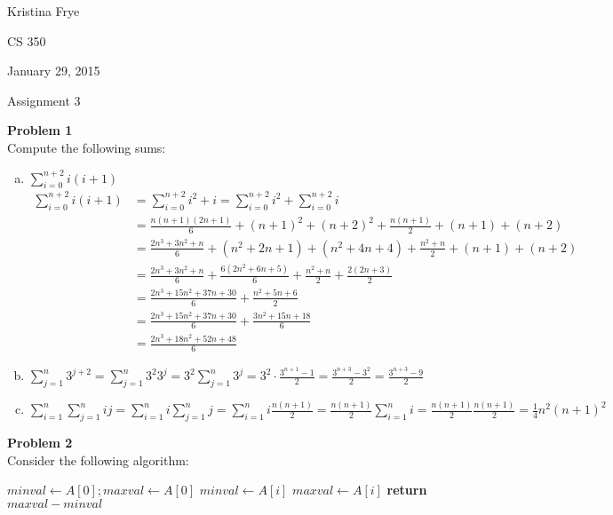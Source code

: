 \documentclass[11pt]{article}
\begin{document}
{\raggedleft Kristina Frye \par}
{\raggedleft CS 350 \par}
{\raggedleft January 29, 2015 \par}
{\raggedleft Assignment 3 \par} 
\noindent\textbf{Problem 1} \\
Compute the following sums:
\begin{enumerate}[(a)]
\item
$\displaystyle\sum_{i=0}^{n+2}i(i + 1)$
\begin{align*}
\sum_{i=0}^{n+2}i(i + 1) &=\sum_{i=0}^{n+2}i^2 + i =
\sum_{i=0}^{n+2}i^2 + \sum_{i=0}^{n+2}i \\
&=\frac{n(n+1)(2n + 1)}{6} + (n+1)^2 + (n+2)^2 + 
\frac{n(n+1)}{2} + (n+1) + (n+2)\\
&=\frac{2n^3 + 3n^2 + n}{6} + (n^2 + 2n + 1) + (n^2 + 4n + 4) +
\frac{n^2 + n}{2} + (n + 1) + (n + 2)\\
&=\frac{2n^3 + 3n^2 + n}{6} + 
\frac{6(2n^2 + 6n + 5)}{6} + \frac{n^2 + n}{2} +
\frac{2(2n + 3)}{2}\\
&=\frac{2n^3 + 15n^2 + 37n + 30}{6} + \frac{n^2 + 5n + 6}{2}\\
&=\frac{2n^3 + 15n^2 + 37n + 30}{6} + \frac{3n^2 + 15n + 18}{6}\\
&=\frac{2n^3 + 18n^2 + 52n + 48}{6}
\end{align*}
\item
$\displaystyle\sum_{j=1}^{n}3^{j+2} = 
\sum_{j=1}^{n}3^2 3^j = 3^2\sum_{j=1}^{n}3^j
= 3^2 \cdot \frac{3^{n+1}-1}{2}
= \frac{3^{n+3} - 3^2}{2}
= \frac{3^{n+3} - 9}{2}$

\item
$\displaystyle\sum_{i=1}^{n}\sum_{j=1}^{n}ij = 
\sum_{i=1}^{n}i\sum_{j=1}^{n}j =
\sum_{i=1}^{n}i \frac{n(n+1)}{2} =
\frac{n(n+1)}{2} \sum_{i=1}^{n}i =
\frac{n(n+1)}{2} \frac{n(n+1)}{2} =
\frac{1}{4} n^2(n+1)^2$ 
\end{enumerate}
\noindent\textbf{Problem 2}\\ 
Consider the following algorithm:
\begin{algorithm}
\begin{algorithmic}
\State $minval \gets A[0]; maxval \gets A[0]$
\State $minval \gets A[i]$
\EndIf
{}
\State $maxval \gets A[i]$
\EndIf
\EndFor
\State \textbf{return} $maxval - minval$
\EndProcedure
\end{algorithmic}
\end{algorithm}
\end{document}
